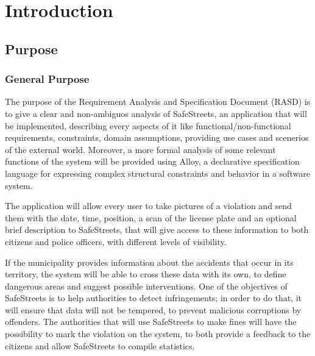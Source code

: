 \documentclass[../RASD.tex]{subfiles}
\begin{document}
    \chapter{Introduction}\label{ch:introduction}
    \section{Purpose}\label{sec:purpose}
        \subsection{General Purpose}\label{subsec:general-purpose}
        The purpose of the Requirement Analysis and Specification Document (RASD) is to give a clear and non-ambiguos analysis of SafeStreets,
        an application that will be implemented, describing every aspects of it like functional/non-functional requirements, constraints,
        domain assumptions, providing use cases and scenerios of the external world.
        Moreover, a more formal analysis of some relevant functions of the system will be provided using Alloy,
        a declarative specification language for expressing complex structural constraints and behavior in a software system.

        The application will allow every user to take pictures of a violation and send them with the date, time, position,
        a scan of the license plate and an optional brief description to SafeStreets, that will give access to these information
        to both citizens and police officers, with different levels of visibility.

        If the municipality provides information about the accidents that occur in its territory, the system will be able to cross these data with its own,
        to define dangerous areas and suggest possible interventions.
        One of the objectives of SafeStreets is to help authorities to detect infringements;
        in order to do that, it will ensure that data will not be tempered, to prevent malicious corruptions by offenders.
        The authorities that will use SafeStreets to make fines will have the possibility to mark the violation on the system,
        to both provide a feedback to the citizens and allow SafeStreets to compile statistics.
\end{document}

